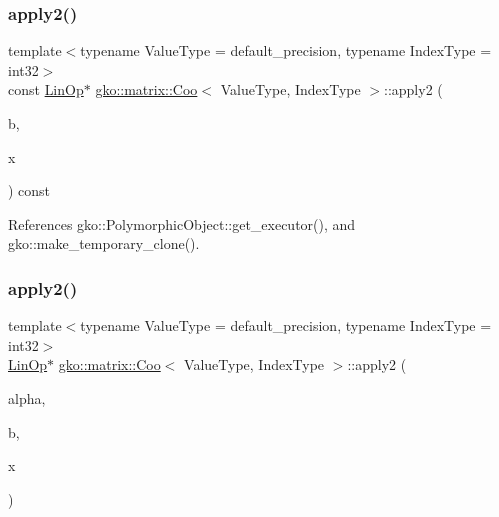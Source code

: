 \subsubsection{\texorpdfstring{apply2()}{apply2()}\hspace{0.1cm}{\footnotesize\ttfamily [2/4]}}
{\footnotesize\ttfamily template$<$typename Value\+Type = default\+\_\+precision, typename Index\+Type = int32$>$ \\
const \hyperlink{classgko_1_1LinOp}{Lin\+Op}$\ast$ \hyperlink{classgko_1_1matrix_1_1Coo}{gko\+::matrix\+::\+Coo}$<$ Value\+Type, Index\+Type $>$\+::apply2 (\begin{DoxyParamCaption}\item[{const \hyperlink{classgko_1_1LinOp}{Lin\+Op} $\ast$}]{b,  }\item[{\hyperlink{classgko_1_1LinOp}{Lin\+Op} $\ast$}]{x }\end{DoxyParamCaption}) const}







References gko\+::\+Polymorphic\+Object\+::get\+\_\+executor(), and gko\+::make\+\_\+temporary\+\_\+clone().

\mbox{\label{classgko_1_1matrix_1_1Coo_a549dafbe9245e3fcef3b02c4d6914c84}} 
\subsubsection{\texorpdfstring{apply2()}{apply2()}\hspace{0.1cm}{\footnotesize\ttfamily [3/4]}}
{\footnotesize\ttfamily template$<$typename Value\+Type = default\+\_\+precision, typename Index\+Type = int32$>$ \\
\hyperlink{classgko_1_1LinOp}{Lin\+Op}$\ast$ \hyperlink{classgko_1_1matrix_1_1Coo}{gko\+::matrix\+::\+Coo}$<$ Value\+Type, Index\+Type $>$\+::apply2 (\begin{DoxyParamCaption}\item[{const \hyperlink{classgko_1_1LinOp}{Lin\+Op} $\ast$}]{alpha,  }\item[{const \hyperlink{classgko_1_1LinOp}{Lin\+Op} $\ast$}]{b,  }\item[{\hyperlink{classgko_1_1LinOp}{Lin\+Op} $\ast$}]{x }\end{DoxyParamCaption})}



